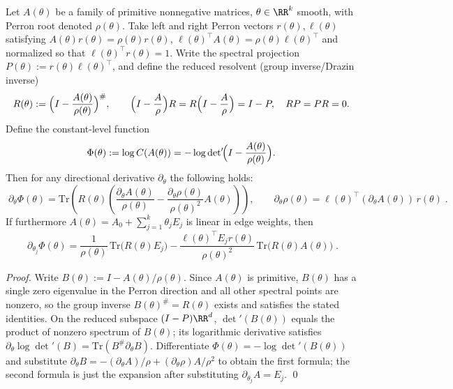\begin{theorem}\label{thm:finite-part-reduced-determinant-group-inverse-gradient}
Let \(A(\theta)\) be a family of primitive nonnegative matrices, \(\theta\in\RR^k\) smooth, with Perron root denoted \(\rho(\theta)\).
Take left and right Perron vectors \(r(\theta),\ell(\theta)\) satisfying
\(
A(\theta)r(\theta)=\rho(\theta)r(\theta)
\),
\(
\ell(\theta)^\top A(\theta)=\rho(\theta)\ell(\theta)^\top
\)
and normalized so that \(\ell(\theta)^\top r(\theta)=1\).
Write the spectral projection \(P(\theta):=r(\theta)\ell(\theta)^\top\), and define the reduced resolvent (group inverse/Drazin inverse)
\[
R(\theta):=\Bigl(I-\frac{A(\theta)}{\rho(\theta)}\Bigr)^{\#},
\qquad
\Bigl(I-\frac{A}{\rho}\Bigr)R=R\Bigl(I-\frac{A}{\rho}\Bigr)=I-P,\quad RP=PR=0.
\]
Define the constant-level function
\[
\Phi(\theta):=\log C(A(\theta))
=
-\log\det\nolimits'\!\Bigl(I-\frac{A(\theta)}{\rho(\theta)}\Bigr).
\]
Then for any directional derivative \(\partial_\theta\) the following holds:
\[
\boxed{\;
\partial_\theta \Phi(\theta)
=
\mathrm{Tr}\!\left(
R(\theta)\left(
\frac{\partial_\theta A(\theta)}{\rho(\theta)}
-\frac{\partial_\theta\rho(\theta)}{\rho(\theta)^2}A(\theta)
\right)\right),\qquad
\partial_\theta\rho(\theta)=\ell(\theta)^\top(\partial_\theta A(\theta))\,r(\theta)\; }.
\]
If furthermore \(A(\theta)=A_0+\sum_{j=1}^{k}\theta_jE_j\) is linear in edge weights, then
\[
\boxed{\;
\partial_{\theta_j}\Phi(\theta)
=
\frac{1}{\rho(\theta)}\,\mathrm{Tr}\!\bigl(R(\theta)E_j\bigr)
-\frac{\ell(\theta)^\top E_j r(\theta)}{\rho(\theta)^2}\,
\mathrm{Tr}\!\bigl(R(\theta)A(\theta)\bigr)\; }.
\]
\end{theorem}
\begin{proof}
Write \(B(\theta):=I-A(\theta)/\rho(\theta)\).
Since \(A(\theta)\) is primitive, \(B(\theta)\) has a single zero eigenvalue in the Perron direction and all other spectral points are nonzero, so the group inverse \(B(\theta)^{\#}=R(\theta)\) exists and satisfies the stated identities.
On the reduced subspace \((I-P)\RR^d\), \(\det\nolimits'(B(\theta))\) equals the product of nonzero spectrum of \(B(\theta)\); its logarithmic derivative satisfies
\(
\partial_\theta\log\det\nolimits'(B)=\mathrm{Tr}(B^{\#}\partial_\theta B)
\).
Differentiate \(\Phi(\theta)=-\log\det\nolimits'(B(\theta))\) and substitute
\(
\partial_\theta B=-(\partial_\theta A)/\rho+(\partial_\theta\rho)A/\rho^2
\)
to obtain the first formula; the second formula is just the expansion after substituting \(\partial_{\theta_j}A=E_j\). \qed
\end{proof}

